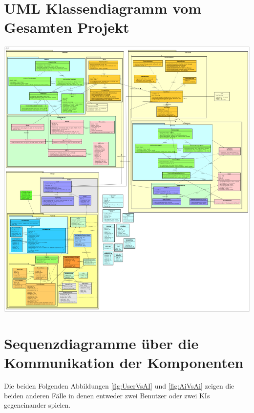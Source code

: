 \documentclass[12pt,a4paper,bibliography=totocnumbered,listof=totocnumbered]{article}
\begin{document}
\begin{appendix}
\section{UML Klassendiagramm vom Gesamten Projekt}
\label{apx:AllClassDiagrams}
\vspace{1em}
\begin{minipage}{\linewidth}
	\centering
	\includegraphics[width=1.0\linewidth]{pics/AllClassDiagrams.png}
\end{minipage}
\pagebreak

\section{Sequenzdiagramme über die Kommunikation der Komponenten}
\label{apx:KommunikationDerKomp}
Die beiden Folgenden Abbildungen \ref{fig:UserVsAI} und \ref{fig:AiVsAi} zeigen die beiden anderen Fälle in 
denen entweder zwei Benutzer oder zwei KIs gegeneinander spielen.


\end{appendix}
\end{document}

